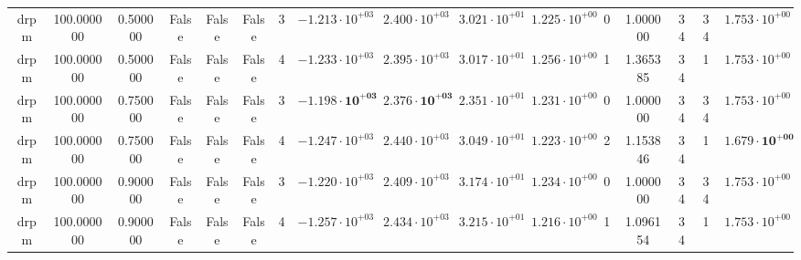 \begin{table}
\begin{tabular}{cccccccccccccccc}
drpm & 100.000000 & 0.500000 & False & False & False & 3 & $-1.213 \cdot 10^{+03}$ & $2.400 \cdot 10^{+03}$ & $3.021 \cdot 10^{+01}$ & $1.225 \cdot 10^{+00}$ & 0 & 1.000000 & 34 & 34 & $1.753 \cdot 10^{+00}$ \\
drpm & 100.000000 & 0.500000 & False & False & False & 4 & $-1.233 \cdot 10^{+03}$ & $2.395 \cdot 10^{+03}$ & $3.017 \cdot 10^{+01}$ & $1.256 \cdot 10^{+00}$ & 1 & 1.365385 & 34 & 1 & $1.753 \cdot 10^{+00}$ \\
drpm & 100.000000 & 0.750000 & False & False & False & 3 & $\mathbf{-1.198 \cdot 10^{+03}}$ & $\mathbf{2.376 \cdot 10^{+03}}$ & $2.351 \cdot 10^{+01}$ & $1.231 \cdot 10^{+00}$ & 0 & 1.000000 & 34 & 34 & $1.753 \cdot 10^{+00}$ \\
drpm & 100.000000 & 0.750000 & False & False & False & 4 & $-1.247 \cdot 10^{+03}$ & $2.440 \cdot 10^{+03}$ & $3.049 \cdot 10^{+01}$ & $1.223 \cdot 10^{+00}$ & 2 & 1.153846 & 34 & 1 & $\mathbf{1.679 \cdot 10^{+00}}$ \\
drpm & 100.000000 & 0.900000 & False & False & False & 3 & $-1.220 \cdot 10^{+03}$ & $2.409 \cdot 10^{+03}$ & $3.174 \cdot 10^{+01}$ & $1.234 \cdot 10^{+00}$ & 0 & 1.000000 & 34 & 34 & $1.753 \cdot 10^{+00}$ \\
drpm & 100.000000 & 0.900000 & False & False & False & 4 & $-1.257 \cdot 10^{+03}$ & $2.434 \cdot 10^{+03}$ & $3.215 \cdot 10^{+01}$ & $1.216 \cdot 10^{+00}$ & 1 & 1.096154 & 34 & 1 & $1.753 \cdot 10^{+00}$ \\
\bottomrule
\end{tabular}
\end{table}
